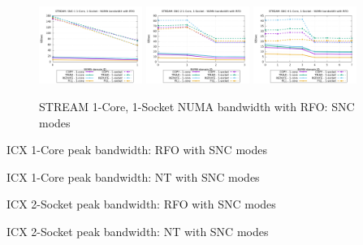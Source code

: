 \documentclass{article}
\begin{document}
\begin{figure}[!hb]
    \centering
    \includegraphics[width=0.3\textwidth]{../data/icx-32c-snc/mem_bw_numa/SNC-1_numa_nps1_compact_rfo}
    \includegraphics[width=0.3\textwidth]{../data/icx-32c-snc/mem_bw_numa/SNC-2_numa_nps2_compact_rfo}
    \includegraphics[width=0.3\textwidth]{../data/icx-32c-snc/mem_bw_numa/SNC-4_numa_nps4_compact_rfo}
    \caption{STREAM 1-Core, 1-Socket NUMA bandwidth with RFO: SNC modes}
    \label{figure:mem_bw_numa_rfo_icx_snc}
\end{figure}

\begin{table}[!hb]
\centering

\caption{ICX 1-Core peak bandwidth: RFO with SNC modes}
\label{table:mem_bw_core_rfo_icx_snc}
\end{table}
\begin{table}[!hb]
\centering

\caption{ICX 1-Core peak bandwidth: NT with SNC modes}
\label{table:mem_bw_core_nt_icx_snc}
\end{table}
\begin{table}[!hb]
\centering

\caption{ICX 2-Socket peak bandwidth: RFO with SNC modes}
\label{table:mem_bw_node_rfo_icx_snc}
\end{table}
\begin{table}[!hb]
\centering

\caption{ICX 2-Socket peak bandwidth: NT with SNC modes}
\label{table:mem_bw_node_nt_icx_snc}
\end{table}
\end{document}
